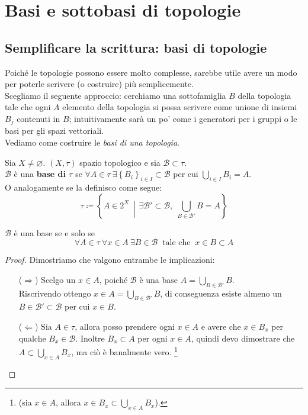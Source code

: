 \newpage
\section{Basi e sottobasi di topologie}
\subsection{\textcolor{TopGener}{\textbf{Semplificare la scrittura: basi di topologie}}}



Poiché le topologie possono essere molto complesse, sarebbe utile avere un modo per poterle scrivere (o costruire) più semplicemente. \\ Scegliamo il seguente approccio: cerchiamo una sottofamiglia $B$ della topologia tale che ogni $A$ elemento della topologia si possa scrivere come unione di insiemi $B_j$ contenuti in $B$; intuitivamente sarà un po' come i generatori per i gruppi o le basi per gli spazi vettoriali. \\ Vediamo come costruire le \textit{basi di una topologia}.

\begin{definition}
	Sia $X \neq \varnothing$. $(X, \tau)$ spazio topologico e sia $\mathcal{B} \subset \tau$. \\ $\mathcal{B}$ è una \textbf{base di $\tau$} se $\forall A \in \tau \ \exists \left\{B_i\right\}_{i \in I} \subset \mathcal{B}$ per cui $\bigcup_{i \in I} B_i = A$. \\ O analogamente se la definisco come segue:
	\begin{equation*}	
		\tau \coloneqq \left\{A \in 2^X \,\middle|\, \exists \mathcal{B}' \subset \mathcal{B} , \; \bigcup_{B \in \mathcal{B}'} B = A \right\}
	\end{equation*}
\end{definition}

\begin{proposition}
	$\mathcal{B}$ è una base se e solo se 
	\begin{equation*}
	\forall A \in \tau\ \forall x \in A\ \exists B \in \mathcal{B} \ \text{ tale che } \ x \in B \subset A
	\end{equation*}
\end{proposition}
\begin{proof} Dimostriamo che valgono entrambe le implicazioni:
	\begin{enumerate}
		\item[($\Rightarrow$)] Scelgo un $x \in A$, poiché $\mathcal{B}$ è una base $A = \bigcup_{B \in \mathcal{B}'} B$. \\ Riscrivendo ottengo $x \in A = \bigcup_{B \in \mathcal{B}'} B$, di conseguenza esiste almeno un $B \in \mathcal{B}' \subset \mathcal{B}$ per cui $x \in B$.
		\item[($\Leftarrow$)]  Sia $A \in \tau$, allora posso prendere ogni $x \in A$ e avere che $x \in B_x$ per qualche $B_x \in \mathcal{B}$. Inoltre $B_x \subset A$ per ogni $x \in A$, quindi devo dimostrare che $A \subset \bigcup_{x \in A} B_x$, ma ciò è banalmente vero. \footnote{(sia $x \in A$, allora $x \in B_x \subset \bigcup_{x \in A} B_x$).}
	\end{enumerate}
\end{proof}

